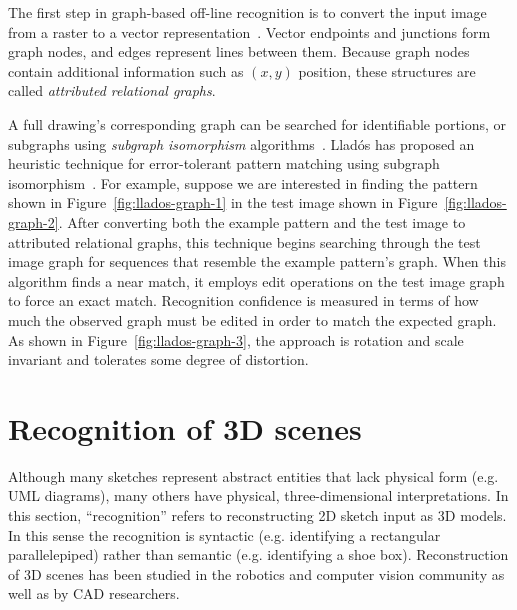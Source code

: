 The first step in graph-based off-line recognition is to convert the
input image from a raster to a vector
representation~\cite{tombre-vectorization}. Vector endpoints and
junctions form graph nodes, and edges represent lines between
them. Because graph nodes contain additional information such as
$(x,y)$ position, these structures are called \textit{attributed
relational graphs}.

A full drawing's corresponding graph can be searched for identifiable
portions, or subgraphs using \textit{subgraph isomorphism}
algorithms~\cite{lee-graph-matching}. Llad\'{o}s has proposed an
heuristic technique for error-tolerant pattern matching using subgraph
isomorphism~\cite{llados-rag}. For example, suppose we are interested
in finding the pattern shown in Figure~\ref{fig:llados-graph-1} in the
test image shown in Figure~\ref{fig:llados-graph-2}. After converting
both the example pattern and the test image to attributed relational
graphs, this technique begins searching through the test image graph
for sequences that resemble the example pattern's graph. When this
algorithm finds a near match, it employs edit operations on the test
image graph to force an exact match. Recognition confidence is
measured in terms of how much the observed graph must be edited in
order to match the expected graph. As shown in
Figure~\ref{fig:llados-graph-3}, the approach is rotation and scale
invariant and tolerates some degree of distortion.

\section{Recognition of 3D scenes}
\label{sec:recognition-3d}

Although many sketches represent abstract entities that lack physical
form (e.g. UML diagrams), many others have physical, three-dimensional
interpretations. In this section, ``recognition'' refers to
reconstructing 2D sketch input as 3D models. In this sense the
recognition is syntactic (e.g. identifying a rectangular
parallelepiped) rather than semantic (e.g. identifying a shoe
box). Reconstruction of 3D scenes has been studied in the robotics and
computer vision community as well as by CAD researchers.

